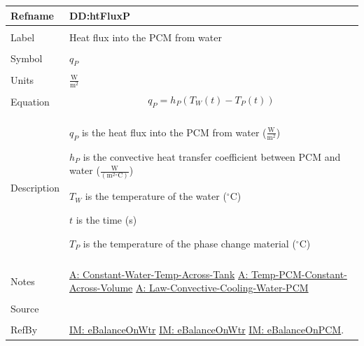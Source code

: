 \documentclass[12pt]{article}
\begin{document}
\noindent \begin{minipage}{\textwidth}
\begin{tabular}{p{} p{}}
\toprule \textbf{Refname} & \textbf{DD:htFluxP}
\label{DD:htFluxP}
\\ \midrule \\
Label & Heat flux into the PCM from water
\\ \midrule \\
Symbol & ${q_{P}}$
\\ \midrule \\
Units & $\frac{\text{W}}{\text{m}^{2}}$
\\ \midrule \\
Equation & \begin{displaymath}
           {q_{P}}={h_{P}} \left({T_{W}}\left(t\right)-{T_{P}}\left(t\right)\right)
           \end{displaymath}
\\ \midrule \\
Description & \begin{symbDescription}
              \item{${q_{P}}$ is the heat flux into the PCM from water ($\frac{\text{W}}{\text{m}^{2}}$)}
              \item{${h_{P}}$ is the convective heat transfer coefficient between PCM and water ($\frac{\text{W}}{(\text{m}^{2}{}^{\circ}\text{C})}$)}
              \item{${T_{W}}$ is the temperature of the water (${}^{\circ}$C)}
              \item{$t$ is the time (s)}
              \item{${T_{P}}$ is the temperature of the phase change material (${}^{\circ}$C)}
              \end{symbDescription}
\\ \midrule \\
Notes & \hyperref[assumpCWTAT]{A: Constant-Water-Temp-Across-Tank}
        \hyperref[assumpTPCAV]{A: Temp-PCM-Constant-Across-Volume}
        \hyperref[assumpLCCWP]{A: Law-Convective-Cooling-Water-PCM}
\\ \midrule \\
Source & \cite{koothoor2013}
\\ \midrule \\
RefBy & \hyperref[IM:eBalanceOnWtr]{IM: eBalanceOnWtr} \hyperref[IM:eBalanceOnWtr]{IM: eBalanceOnWtr} \hyperref[IM:eBalanceOnPCM]{IM: eBalanceOnPCM}.
\\ \bottomrule \end{tabular}
\end{minipage}
\par~
\end{document}
